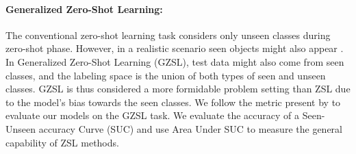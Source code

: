 \documentclass[11pt,a4paper]{article}
\begin{document}
\paragraph{Generalized Zero-Shot Learning:} 
The conventional zero-shot learning task considers only unseen classes during zero-shot phase. However, in a realistic scenario seen objects might also appear \cite{chao2016empirical}. In Generalized Zero-Shot Learning (GZSL), test data might also come from seen classes, and the labeling space is the union of both types of seen and unseen classes. GZSL is thus considered a more formidable problem setting
than ZSL due to the model's bias towards the seen classes.
We follow the metric present by \citet{chao2016empirical} to evaluate our models on the GZSL task. We evaluate the accuracy of a Seen-Unseen accuracy Curve (SUC) and use Area Under  SUC to measure the general capability of ZSL methods.
\end{document}
